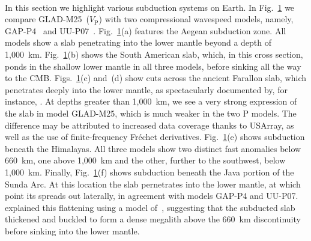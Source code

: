 \begin{figure}
    \\[-8pt]
    \label{fig:subd}
\end{figure}

In this section we highlight various subduction systems on Earth.
In Fig.~\ref{fig:subd} we compare GLAD-M25~($V_\textrm{P}$) with two compressional wavespeed models,
namely, GAP-P4~\cite{fukao2013subducted} and UU-P07~\cite{van2018atlas}.
Fig.~\ref{fig:subd}(a) features the Aegean subduction zone. All models show a slab penetrating into the lower mantle beyond a depth of 1,000~km.
Fig.~\ref{fig:subd}(b) shows the South American slab, which, in this cross section, ponds in the shallow lower mantle in all three models, before sinking all the way to the CMB.
Figs.~\ref{fig:subd}(c) and~(d) show cuts across the ancient Farallon slab, which penetrates deeply into the lower mantle,
as spectacularly documented by, for instance, \citet{grand1994,hilst1997,grand1997high}.
At depths greater than 1,000~km, 
we see a very strong expression of the slab in model GLAD-M25, which is much weaker in the two P models.
The difference may be attributed to increased data coverage thanks to USArray, as well as the use of finite-frequency Fr\'echet derivatives.
Fig.~\ref{fig:subd}(e) shows subduction beneath the Himalayas.
All three models show two distinct fast anomalies below 660~km,
one above 1,000~km and the other, further to the southwest, below 1,000~km.
Finally, Fig.~\ref{fig:subd}(f) shows subduction beneath the Java portion of the Sunda Arc.
At this location the slab pernetrates into the lower mantle, at which point its spreads out laterally,
in agreement with models GAP-P4 and UU-P07.
\cite{fukao1992} explained this flattening using a model of~\cite{ringwood1988},
suggesting that the subducted slab thickened and buckled to form a dense megalith
above the 660~km discontinuity before sinking into the lower mantle.

